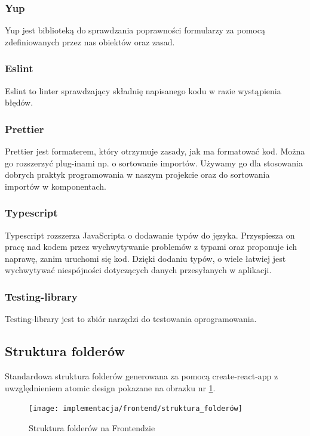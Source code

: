 \documentclass[a4paper,11pt]{report}
\begin{document}
\subsubsection{Yup}
Yup\cite{yup} jest biblioteką do sprawdzania poprawności formularzy za pomocą zdefiniowanych przez nas obiektów oraz zasad.

\subsubsection{Eslint}
Eslint\cite{eslint} to linter sprawdzający składnię napisanego kodu w razie wystąpienia błędów.\\  

\subsubsection{Prettier}
Prettier\cite{prettier} jest formaterem, który otrzymuje zasady, jak ma formatować kod.
 Można go rozszerzyć plug-inami np. o sortowanie importów.
 Używamy go dla stosowania dobrych praktyk programowania w naszym projekcie oraz do sortowania importów w komponentach.\\

\subsubsection{Typescript}
\label{subsec:typescript}
Typescript\cite{typescript} rozszerza JavaScripta o dodawanie typów do języka. 
Przyspiesza on pracę nad kodem przez wychwytywanie problemów z typami oraz proponuje ich naprawę, zanim uruchomi się kod.
Dzięki dodaniu typów, o wiele łatwiej jest wychwytywać niespójności dotyczących danych przesyłanych w aplikacji.\\

\subsubsection{Testing-library}
Testing-library\cite{testing-library} jest to zbiór narzędzi do testowania oprogramowania.\\

\subsection{Struktura folderów}
Standardowa struktura folderów generowana za pomocą create-react-app z uwzględnieniem atomic design pokazane na obrazku nr \ref{fig:struktura_folderów_front}.
\begin{figure}[H]
	\centering
	\texttt{[image: implementacja/frontend/struktura\_folderów]}\\
	\caption{Struktura folderów na Frontendzie}
	\label{fig:struktura_folderów_front}
\end{figure}
\end{document}
